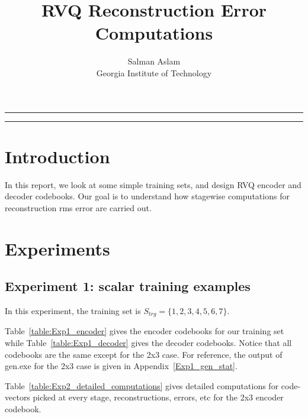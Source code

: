 
\title{RVQ Reconstruction Error Computations}
\author{Salman Aslam\\ Georgia Institute of Technology}
\date{}


\maketitle
\rule[0pt]{\textwidth}{1pt}
\tableofcontents
\rule[0pt]{\textwidth}{1pt}


\section{Introduction}
In this report, we look at some simple training sets, and design RVQ encoder and decoder codebooks.  Our goal is to understand how stagewise computations for reconstruction rms error are carried out.


\section{Experiments}
\subsection{Experiment 1: scalar training examples}
In this experiment, the training set is $S_{trg}=\{1,2,3,4,5,6,7\}$.

Table~\ref{table:Exp1_encoder} gives the encoder codebooks for our training set while Table~\ref{table:Exp1_decoder} gives the decoder codebooks.  Notice that all codebooks are the same except for the 2x3 case.  For reference, the output of gen.exe for the 2x3 case is given in Appendix~\ref{Exp1_gen_stat}.

Table~\ref{table:Exp2_detailed_computations} gives detailed computations for code-vectors picked at every stage, reconstructions, errors, etc for the 2x3 encoder codebook.  

